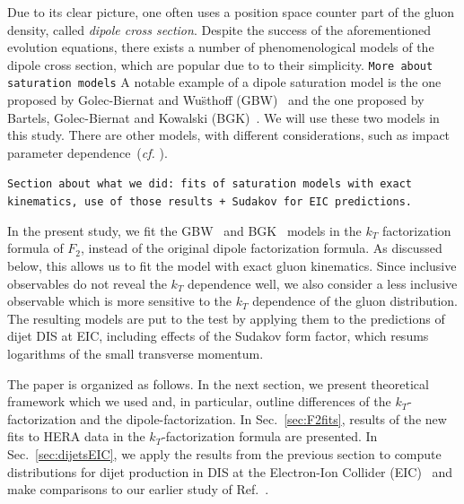 \documentclass[11pt]{article}
\newcommand{\commentPending}[1]{\texttt{\color{red!25}#1}}
\begin{document}
Due to its clear picture, one often uses a position space counter part of the gluon density, called {\it dipole cross section}. Despite the success of the aforementioned evolution equations, there exists a number of phenomenological models of the dipole cross section, which are popular due to to their simplicity. 
\commentPending{More about saturation models}
A notable example of a dipole saturation model is the one proposed by
Golec-Biernat and Wu\"sthoff (GBW)~\cite{Golec-Biernat:1998zce} and the one proposed by
Bartels, Golec-Biernat and Kowalski (BGK)~\cite{Bartels:2002cj}. We will use these two models in this study. There are other models, with different considerations, such as impact parameter dependence~({\it cf.}
\cite{Kowalski:2003hm,McLerran:1993ni,Forshaw:1999uf,Iancu:2003ge}).

\commentPending{Section about what we did: fits of saturation models with exact
kinematics, use of those results + Sudakov for EIC predictions.}

In the present study, we fit the GBW~\cite{Golec-Biernat:1998zce} and BGK~\cite{Bartels:2002cj} models in the $k_T$ factorization formula of $F_2$, instead of the original dipole factorization formula. As discussed below, this allows us to fit the model with exact gluon kinematics. 
Since inclusive observables do not reveal the $k_T$ dependence well, we also consider a less inclusive observable which is more sensitive to the $k_T$ dependence of the gluon distribution.
The resulting models are put to the test by applying them to the predictions of dijet DIS at EIC, including effects of the Sudakov form factor, which resums logarithms of the small transverse momentum. 
 

The paper is organized as follows.  In the next section, we present theoretical
framework which we used and, in particular, outline differences of the
$k_T$-factorization and the dipole-factorization.  In
Sec.~\ref{sec:F2fits}, results of the new fits to HERA data in the
$k_T$-factorization formula are presented. 
In Sec.~\ref{sec:dijetsEIC}, we apply the results from the previous section to
compute distributions for dijet production in DIS at the Electron-Ion Collider
(EIC)~\cite{NAP25171} and make comparisons to our earlier study of Ref.~\cite{vanHameren:2021sqc}.

\end{document}
